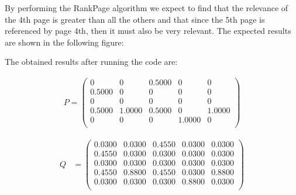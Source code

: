 \documentclass{article}
\begin{document}
By performing the RankPage algorithm we expect to find that the
relevance of the 4th page is greater than all the others and 
that since the 5th page is referenced by page 4th, then it
must also be very relevant. The expected results are shown in the 
following figure:

\begin{center}
\end{center}

The obtained results after running the code are:

\begin{equation*}
\begin{aligned}
P = 
\begin{pmatrix}
0&0&0.5000&0&0\\
0.5000&0&0&0&0\\
0&0&0&0&0\\
0.5000&1.0000&0.5000&0&1.0000\\
0&0&0&1.0000&0\\
\end{pmatrix} 
\end{aligned}
\end{equation*} 

\begin{equation*}
\begin{aligned}
Q &= 
\begin{pmatrix}
0.0300&0.0300&0.4550&0.0300&0.0300\\
0.4550&0.0300&0.0300&0.0300&0.0300\\
0.0300&0.0300&0.0300&0.0300&0.0300\\
0.4550&0.8800&0.4550&0.0300&0.8800\\
0.0300&0.0300&0.0300&0.8800&0.0300\\
\end{pmatrix} 
\end{aligned}
\end{equation*} 
\end{document}
